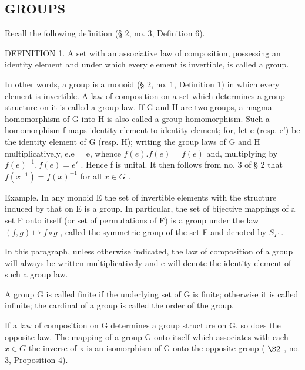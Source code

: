\subsection{GROUPS}

Recall the following definition (§ 2, no. 3, Definition 6).

DEFINITION 1. A set with an associative law of composition, possessing an identity element and under which every element is invertible, is called a group.

In other words, a group is a monoid (§ 2, no. 1, Definition 1) in which every element is invertible. A law of composition on a set which determines a group structure on it is called a group law. If G and H are two groups, a magma homomorphism of G into H is also called a group homomorphism. Such a homomorphism f maps identity element to identity element; for, let e (resp. e') be the identity element of G (resp. H); writing the group laws of G and H multiplicatively, e.e = e, whence \(f(e).f(e) = f(e)\) and, multiplying by \(f(e)^{-1}, f(e) = e'\) . Hence f is unital. It then follows from no. 3 of § 2 that \(f(x^{-1}) = f(x)^{-1}\) for all \(x \in G\) .

Example. In any monoid E the set of invertible elements with the structure induced by that on E is a group. In particular, the set of bijective mappings of a set F onto itself (or set of permutations of F) is a group under the law \((f, g) \mapsto f \circ g\) , called the symmetric group of the set F and denoted by \(S_{F}\) .

In this paragraph, unless otherwise indicated, the law of composition of a group will always be written multiplicatively and e will denote the identity element of such a group law.

A group G is called finite if the underlying set of G is finite; otherwise it is called infinite; the cardinal of a group is called the order of the group.

If a law of composition on G determines a group structure on G, so does the opposite law. The mapping of a group G onto itself which associates with each \(x \in G\) the inverse of x is an isomorphism of G onto the opposite group ( \(\S 2\) , no. 3, Proposition 4).

